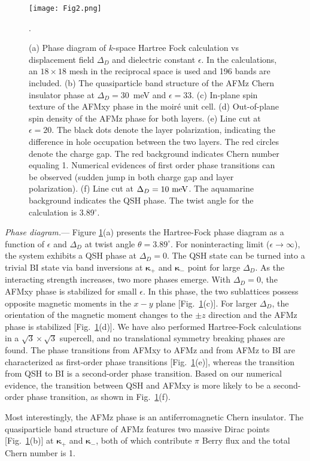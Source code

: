 \documentclass[twocolumn,aps,prl,superscriptaddress]{revtex4-2}
\begin{document}
\begin{figure}
\centering
\texttt{[image: Fig2.png]}
\caption{(a) Phase diagram of $k$-space Hartree Fock calculation vs displacement field $\Delta_D$ and dielectric constant $\epsilon$. In the calculations, an $18 \times 18$ mesh in the reciprocal space is used and 196 bands are included. (b) The quasiparticle band structure of the AFMz Chern insulator phase at $\Delta_D = 30$~meV and $\epsilon = 33$. (c) In-plane spin texture of the AFMxy phase in the moir\'e unit cell. (d) Out-of-plane spin density of the AFMz phase for both layers. (e) Line cut at $\epsilon=20$. The black dots denote the layer polarization, indicating the difference in hole occupation between the two layers. The red circles denote the charge gap. The red background indicates Chern number equaling 1. Numerical evidences of first order phase transitions can be observed (sudden jump in both charge gap and layer polarization). (f) Line cut at $\Delta_D=10~\rm{meV}$. The aquamarine background indicates the QSH phase. The twist angle for the calculation is 3.89$^\circ$.\label{fig2}}.
\end{figure}

\textit{Phase diagram.}---
Figure \ref{fig2}(a) presents the Hartree-Fock phase diagram as a function of $\epsilon$ and $\Delta_D$ at twist angle $\theta=3.89^\circ$. For noninteracting limit ($\epsilon \to \infty$), the system exhibits a QSH phase at $\Delta_D = 0$. The QSH state can be turned into a trivial BI state via band inversions at $\bm{\kappa}_+$ and $\bm{\kappa}_-$ point for large $\Delta_D$. As the interacting strength increases, two more phases emerge. With $\Delta_D=0$, the AFMxy phase is stabilized for small $\epsilon$. In this phase, the two sublattices possess opposite magnetic moments in the $x-y$ plane [Fig.~\ref{fig2}(c)]. For larger $\Delta_D$, the orientation of the magnetic moment changes to the $\pm z$ direction and the AFMz phase is stabilized [Fig.~\ref{fig2}(d)]. We have also performed Hartree-Fock calculations in a $\sqrt{3}\times\sqrt{3}$ supercell, and no translational symmetry breaking phases are found. The phase transitions from AFMxy to AFMz and from AFMz to BI are characterized as first-order phase transitions [Fig.~\ref{fig2}(e)], whereas the transition from QSH to BI is a second-order phase transition. Based on our numerical evidence, the transition between QSH and AFMxy is more likely to be a second-order phase transition, as shown in Fig.~\ref{fig2}(f).

Most interestingly, the AFMz phase is an antiferromagnetic Chern insulator. The quasiparticle band structure of AFMz features two massive Dirac points [Fig.~\ref{fig2}(b)] at $\bm{\kappa_+}$ and $\bm{\kappa_-}$, both of which contribute $\pi$ Berry flux and the total Chern number is 1. 
\end{document}
